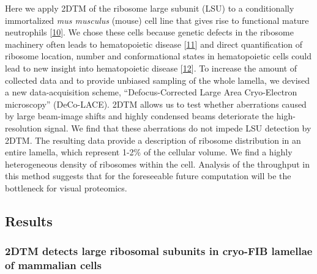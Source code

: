 \documentclass[
]{article}
\begin{document}
Here we apply 2DTM of the ribosome large subunit (LSU) to a conditionally immortalized \emph{mus musculus} (mouse) cell line that gives rise to functional mature neutrophils {[}\protect\hyperlink{ref-1B9Vt9eYu}{10}{]}. We chose these
cells because genetic defects in the ribosome machinery often leads to
hematopoietic disease {[}\protect\hyperlink{ref-gRoY21jY}{11}{]} and direct quantification of
ribosome location, number and conformational states in hematopoietic cells could
lead to new insight into hematopoietic disease {[}\protect\hyperlink{ref-KAJ7221k}{12}{]}.
To increase the amount of collected data and to provide unbiased sampling of the
whole lamella, we devised a new data-acquisition scheme, ``Defocus-Corrected
Large Area Cryo-Electron microscopy'' (DeCo-LACE). 2DTM allows us to test whether
aberrations caused by large beam-image shifts and highly condensed beams
deteriorate the high-resolution signal. We find that these aberrations do not
impede LSU detection by 2DTM. The resulting data provide a description of
ribosome distribution in an entire lamella, which represent 1-2\% of the cellular
volume. We find a highly heterogeneous density of ribosomes within the cell.
Analysis of the throughput in this method suggests that for the foreseeable
future computation will be the bottleneck for visual proteomics.

\hypertarget{results}{%
\subsection{Results}\label{results}}

\hypertarget{dtm-detects-large-ribosomal-subunits-in-cryo-fib-lamellae-of-mammalian-cells}{%
\subsubsection{2DTM detects large ribosomal subunits in cryo-FIB lamellae of mammalian cells}\label{dtm-detects-large-ribosomal-subunits-in-cryo-fib-lamellae-of-mammalian-cells}}
\end{document}
